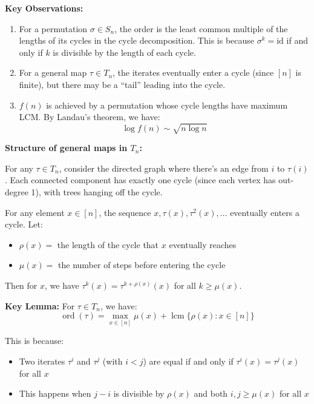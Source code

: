 \documentclass[12pt,a4paper]{article}
\theoremstyle{definition}
\begin{document}
    \textbf{Key Observations:}

    \begin{enumerate}
        \item For a permutation $\sigma \in S_n$, the order is the least common multiple of the lengths of its cycles in the cycle decomposition. This is because $\sigma^k = \text{id}$ if and only if $k$ is divisible by the length of each cycle.

        \item For a general map $\tau \in T_n$, the iterates eventually enter a cycle (since $[n]$ is finite), but there may be a ``tail'' leading into the cycle.

        \item $f(n)$ is achieved by a permutation whose cycle lengths have maximum LCM. By Landau's theorem, we have:
        $$\log f(n) \sim \sqrt{n \log n}$$
    \end{enumerate}

    \textbf{Structure of general maps in $T_n$:}

    For any $\tau \in T_n$, consider the directed graph where there's an edge from $i$ to $\tau(i)$. Each connected component has exactly one cycle (since each vertex has out-degree 1), with trees hanging off the cycle.

    For any element $x \in [n]$, the sequence $x, \tau(x), \tau^2(x), \ldots$ eventually enters a cycle. Let:
    \begin{itemize}
        \item $\rho(x) =$ the length of the cycle that $x$ eventually reaches
        \item $\mu(x) =$ the number of steps before entering the cycle
    \end{itemize}

    Then for $x$, we have $\tau^{k}(x) = \tau^{k+\rho(x)}(x)$ for all $k \geq \mu(x)$.

    \textbf{Key Lemma:} For $\tau \in T_n$, we have:
    $$\operatorname{ord}(\tau) = \max_{x \in [n]} \mu(x) + \operatorname{lcm}\{\rho(x) : x \in [n]\}$$

    This is because:
    \begin{itemize}
        \item Two iterates $\tau^i$ and $\tau^j$ (with $i < j$) are equal if and only if $\tau^i(x) = \tau^j(x)$ for all $x$
        \item This happens when $j - i$ is divisible by $\rho(x)$ and both $i, j \geq \mu(x)$ for all $x$
    \end{itemize}
\end{document}
